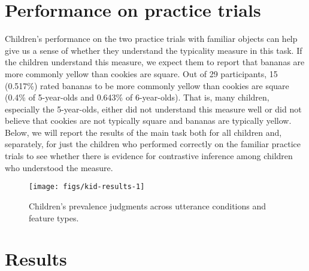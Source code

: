 \documentclass{ucetd}
\begin{document}
\hypertarget{performance-on-practice-trials}{%
\section{Performance on practice
trials}\label{performance-on-practice-trials}}

Children's performance on the two practice trials with familiar objects
can help give us a sense of whether they understand the typicality
measure in this task. If the children understand this measure, we expect
them to report that bananas are more commonly yellow than cookies are
square. Out of 29 participants, 15 (0.517\%) rated bananas to be more
commonly yellow than cookies are square (0.4\% of 5-year-olds and
0.643\% of 6-year-olds). That is, many children, especially the
5-year-olds, either did not understand this measure well or did not
believe that cookies are not typically square and bananas are typically
yellow. Below, we will report the results of the main task both for all
children and, separately, for just the children who performed correctly
on the familiar practice trials to see whether there is evidence for
contrastive inference among children who understood the measure.

\begin{figure}[!tb]

{\centering \texttt{[image: figs/kid-results-1]} 

}

\caption{Children's prevalence judgments across utterance conditions and feature types.}\label{fig:kid-results}
\end{figure}

\hypertarget{results-4}{%
\section{Results}\label{results-4}}
\end{document}
